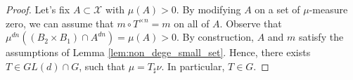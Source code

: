 \documentclass[10pt,a4paper]{amsart}
\newcommand{\X}{\mathcal{X}}
\begin{document}
\begin{proof}
    Let's fix $A\subset\X$ with $\mu(A)>0$. By modifying $A$ on a set of $\mu$-measure zero, we can assume that $m\circ T^{\times n}=m$ on all of $A$. Observe that $\mu^{dn}((B_2\times B_1)\cap  A^{dn})=\mu(A)>0$.
    By construction, $A$ and $m$ satisfy the assumptions of Lemma \ref{lem:non_dege_small_set}. Hence, there exists $T\in GL(d)\cap G$, such that $\mu = T_\sharp \nu$. In particular, $T\in G$.
\end{proof}
\end{document}
